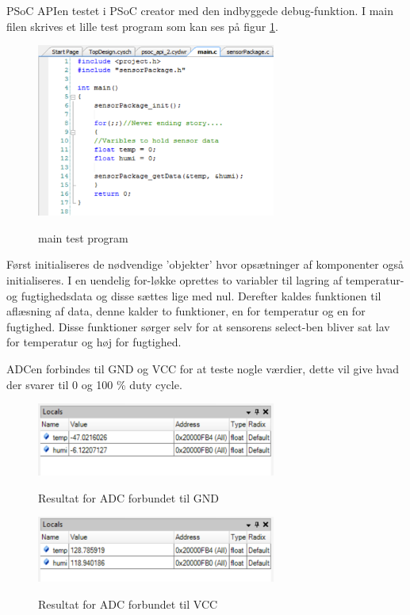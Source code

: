 
PSoC APIen testet i PSoC creator med den indbyggede debug-funktion. I main filen skrives et lille test program som kan ses på figur \ref{lab:sht_testmain}.

\begin{figure}[htb]
\centering
{\includegraphics[width=0.70\textwidth]{filer/modultest/Billeder/psoc_testmain}}
\caption{main test program}
\label{lab:sht_testmain}
\end{figure}

Først initialiseres de nødvendige 'objekter' hvor opsætninger af komponenter også initialiseres. I en uendelig for-løkke oprettes to variabler til lagring af temperatur- og fugtighedsdata og disse sættes lige med nul. Derefter kaldes funktionen til aflæsning af data, denne kalder to funktioner, en for temperatur og en for fugtighed. Disse funktioner sørger selv for at sensorens select-ben bliver sat lav for temperatur og høj for fugtighed. 

ADCen forbindes til GND og VCC for at teste nogle værdier, dette vil give hvad der svarer til 0 og 100 \% duty cycle. 
  
\begin{figure}[htb]
\centering
{\includegraphics[width=0.70\textwidth]{filer/modultest/Billeder/psoc_api_test1}}
\caption{Resultat for ADC forbundet til GND}
\label{lab:sht_api_test1}
\end{figure}

\begin{figure}[htb]
\centering
{\includegraphics[width=0.70\textwidth]{filer/modultest/Billeder/psoc_api_test2}}
\caption{Resultat for ADC forbundet til VCC}
\label{lab:sht_api_test2}
\end{figure}

